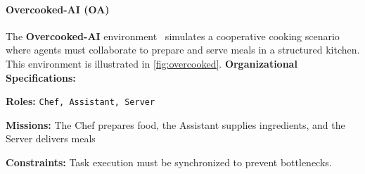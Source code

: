 \documentclass[pdflatex,sn-mathphys-num]{sn-jnl}%
\theoremstyle{thmstyleone}%
\theoremstyle{thmstyletwo}%
\theoremstyle{thmstylethree}%
\begin{document}
\paragraph{Overcooked-AI (OA)}
The \textbf{Overcooked-AI} environment~\cite{Carroll2019} simulates a cooperative cooking scenario where agents must collaborate to prepare and serve meals in a structured kitchen. This environment is illustrated in \autoref{fig:overcooked}.
%
%
\textbf{Organizational Specifications:}
\begin{enumerate*}[label={\roman*)}, itemjoin={; \quad}]
    \item \textbf{Roles:} \texttt{Chef, Assistant, Server}
    \item \textbf{Missions:} The Chef prepares food, the Assistant supplies ingredients, and the Server delivers meals
    \item \textbf{Constraints:} Task execution must be synchronized to prevent bottlenecks.
\end{enumerate*}
\end{document}
